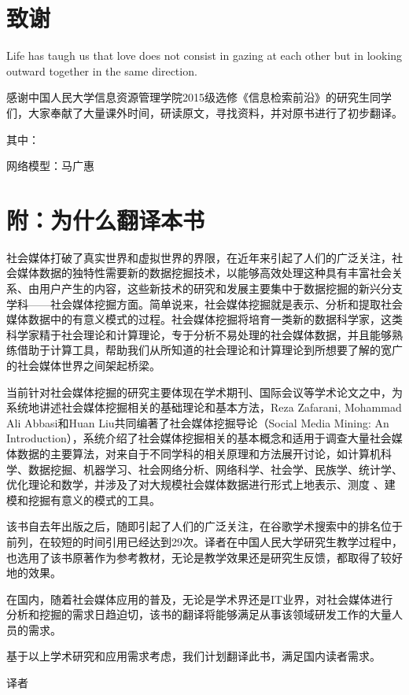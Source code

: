 \chapter*{致谢}

Life has taugh us that love does not consist in gazing at each other but in looking outward together in the same direction.

感谢中国人民大学信息资源管理学院2015级选修《信息检索前沿》的研究生同学们，大家奉献了大量课外时间，研读原文，寻找资料，并对原书进行了初步翻译。

其中：

网络模型：马广惠


\chapter*{附：为什么翻译本书}
社会媒体打破了真实世界和虚拟世界的界限，在近年来引起了人们的广泛关注，社会媒体数据的独特性需要新的数据挖掘技术，以能够高效处理这种具有丰富社会关系、由用户产生的内容，这些新技术的研究和发展主要集中于数据挖掘的新兴分支学科——社会媒体挖掘方面。简单说来，社会媒体挖掘就是表示、分析和提取社会媒体数据中的有意义模式的过程。社会媒体挖掘将培育一类新的数据科学家，这类科学家精于社会理论和计算理论，专于分析不易处理的社会媒体数据，并且能够熟练借助于计算工具，帮助我们从所知道的社会理论和计算理论到所想要了解的宽广的社会媒体世界之间架起桥梁。

当前针对社会媒体挖掘的研究主要体现在学术期刊、国际会议等学术论文之中，为系统地讲述社会媒体挖掘相关的基础理论和基本方法，Reza Zafarani, Mohammad Ali Abbasi和Huan Liu共同编著了社会媒体挖掘导论（Social Media Mining: An Introduction），系统介绍了社会媒体挖掘相关的基本概念和适用于调查大量社会媒体数据的主要算法，对来自于不同学科的相关原理和方法展开讨论，如计算机科学、数据挖掘、机器学习、社会网络分析、网络科学、社会学、民族学、统计学、优化理论和数学，并涉及了对大规模社会媒体数据进行形式上地表示、测度 、建模和挖掘有意义的模式的工具。

该书自去年出版之后，随即引起了人们的广泛关注，在谷歌学术搜索中的排名位于前列，在较短的时间引用已经达到29次。译者在中国人民大学研究生教学过程中，也选用了该书原著作为参考教材，无论是教学效果还是研究生反馈，都取得了较好地的效果。

在国内，随着社会媒体应用的普及，无论是学术界还是IT业界，对社会媒体进行分析和挖掘的需求日趋迫切，该书的翻译将能够满足从事该领域研发工作的大量人员的需求。

基于以上学术研究和应用需求考虑，我们计划翻译此书，满足国内读者需求。

\begin{flushright}
译者
\end{flushright}



